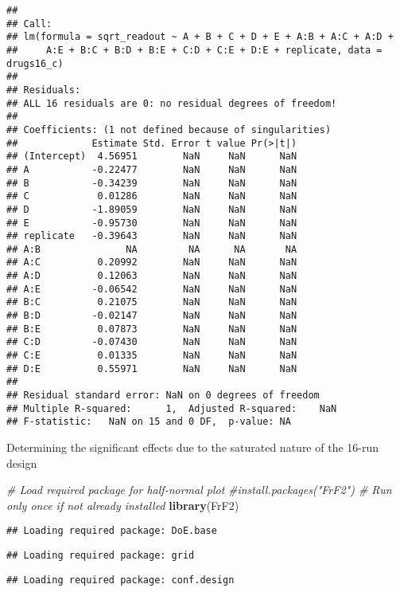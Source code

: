 \documentclass[
]{article}
\newenvironment{Shaded}{\begin{snugshade}}{\end{snugshade}}
\newcommand{\CommentTok}[1]{\textcolor[rgb]{0.56,0.35,0.01}{\textit{#1}}}
\newcommand{\FunctionTok}[1]{\textcolor[rgb]{0.13,0.29,0.53}{\textbf{#1}}}
\newcommand{\NormalTok}[1]{#1}
\begin{document}
\begin{verbatim}
## 
## Call:
## lm(formula = sqrt_readout ~ A + B + C + D + E + A:B + A:C + A:D + 
##     A:E + B:C + B:D + B:E + C:D + C:E + D:E + replicate, data = drugs16_c)
## 
## Residuals:
## ALL 16 residuals are 0: no residual degrees of freedom!
## 
## Coefficients: (1 not defined because of singularities)
##             Estimate Std. Error t value Pr(>|t|)
## (Intercept)  4.56951        NaN     NaN      NaN
## A           -0.22477        NaN     NaN      NaN
## B           -0.34239        NaN     NaN      NaN
## C            0.01286        NaN     NaN      NaN
## D           -1.89059        NaN     NaN      NaN
## E           -0.95730        NaN     NaN      NaN
## replicate   -0.39643        NaN     NaN      NaN
## A:B               NA         NA      NA       NA
## A:C          0.20992        NaN     NaN      NaN
## A:D          0.12063        NaN     NaN      NaN
## A:E         -0.06542        NaN     NaN      NaN
## B:C          0.21075        NaN     NaN      NaN
## B:D         -0.02147        NaN     NaN      NaN
## B:E          0.07873        NaN     NaN      NaN
## C:D         -0.07430        NaN     NaN      NaN
## C:E          0.01335        NaN     NaN      NaN
## D:E          0.55971        NaN     NaN      NaN
## 
## Residual standard error: NaN on 0 degrees of freedom
## Multiple R-squared:      1,  Adjusted R-squared:    NaN 
## F-statistic:   NaN on 15 and 0 DF,  p-value: NA
\end{verbatim}

Determining the significant effects due to the saturated nature of the
16-run design

\begin{Shaded}
\begin{Highlighting}[]
\CommentTok{\# Load required package for half{-}normal plot}
\CommentTok{\#install.packages("FrF2")  \# Run only once if not already installed}
\FunctionTok{library}\NormalTok{(FrF2)}
\end{Highlighting}
\end{Shaded}

\begin{verbatim}
## Loading required package: DoE.base
\end{verbatim}

\begin{verbatim}
## Loading required package: grid
\end{verbatim}

\begin{verbatim}
## Loading required package: conf.design
\end{verbatim}
\end{document}
